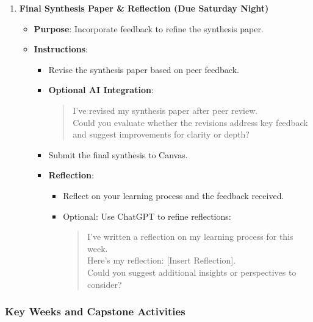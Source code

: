 \documentclass[12pt, letterpaper]{article}
\begin{document}
\begin{enumerate}
    \item \textbf{Final Synthesis Paper \& Reflection (Due Saturday Night)}
    \begin{itemize}
        \item \textbf{Purpose}: Incorporate feedback to refine the synthesis paper.
        \item \textbf{Instructions}:
        \begin{itemize}
            \item Revise the synthesis paper based on peer feedback.
            \item \textbf{Optional AI Integration}:
            \begin{quote}
                I’ve revised my synthesis paper after peer review. \\ 
                Could you evaluate whether the revisions address key feedback and suggest improvements for clarity or depth?
            \end{quote}
            \item Submit the final synthesis to Canvas.
            \item \textbf{Reflection}:
            \begin{itemize}
                \item Reflect on your learning process and the feedback received.
                \item Optional: Use ChatGPT to refine reflections:
                \begin{quote}
                    I’ve written a reflection on my learning process for this week. \\ 
                    Here’s my reflection: [Insert Reflection]. \\ 
                    Could you suggest additional insights or perspectives to consider?
                \end{quote}
            \end{itemize}
        \end{itemize}
    \end{itemize}
\end{enumerate}

\subsubsection*{Key Weeks and Capstone Activities}
\end{document}
